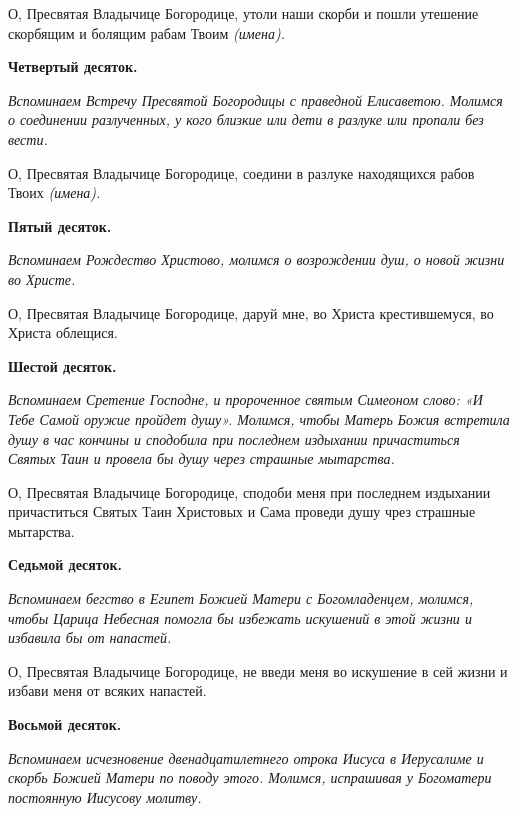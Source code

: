 \normalfont{}О, Пресвятая Владычице Богородице, утоли наши скорби и пошли утешение скорбящим и болящим рабам Твоим \itshape (имена)\normalfont{}.


\medskip


\bfseries Четвертый десяток.\normalfont{}\nopagebreak


\itshape Вспоминаем Встречу Пресвятой Богородицы с праведной Елисаветою. Молимся о соединении разлученных, у кого близкие или дети в разлуке или пропали без вести.

\normalfont{}О, Пресвятая Владычице Богородице, соедини в разлуке находящихся рабов Твоих \itshape (имена)\normalfont{}.


\medskip


\bfseries Пятый десяток.\normalfont{}\nopagebreak


\itshape Вспоминаем Рождество Христово, молимся о возрождении душ, о новой жизни во Христе.\normalfont{}

О, Пресвятая Владычице Богородице, даруй мне, во Христа крестившемуся, во Христа облещися.


\medskip


\bfseries Шестой десяток.\normalfont{}\nopagebreak


\itshape Вспоминаем Сретение Господне, и пророченное святым Симеоном слово: «И Тебе Самой оружие пройдет душу». Молимся, чтобы Матерь Божия встретила душу в час кончины и сподобила при последнем издыхании причаститься Святых Таин и провела бы душу через страшные мытарства.

\normalfont{}О, Пресвятая Владычице Богородице, сподоби меня при последнем издыхании причаститься Святых Таин Христовых и Сама проведи душу чрез страшные мытарства.


\medskip


\bfseries Седьмой десяток.\normalfont{}\nopagebreak


\itshape Вспоминаем бегство в Египет Божией Матери с Богомладенцем, молимся, чтобы Царица Небесная помогла бы избежать искушений в этой жизни и избавила бы от напастей.

\normalfont{}О, Пресвятая Владычице Богородице, не введи меня во искушение в сей жизни и избави меня от всяких напастей.


\medskip


\bfseries Восьмой десяток.\normalfont{}\nopagebreak


\itshape Вспоминаем исчезновение двенадцатилетнего отрока Иисуса в Иерусалиме и скорбь Божией Матери по поводу этого. Молимся, испрашивая у Богоматери постоянную Иисусову молитву.

